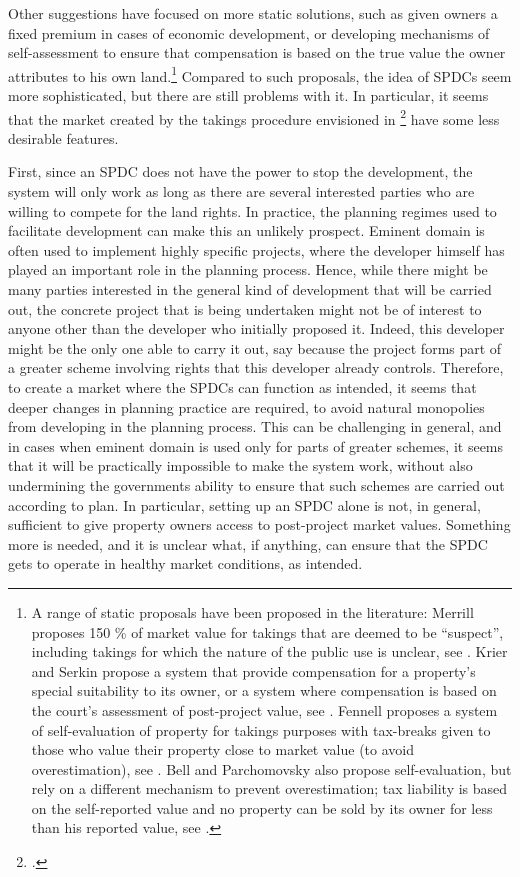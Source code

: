 Other suggestions have focused on more static solutions, such as given owners a fixed premium in cases of economic development, or developing mechanisms of self-assessment to ensure that compensation is based on the true value the owner attributes to his own land.\footnote{A range of static proposals have been proposed in the literature: Merrill proposes 150 \% of market value for takings that are deemed to be ``suspect'', including takings for which the nature of the public use is unclear, see \cite[90-93]{merrill86}. Krier and Serkin propose a system that provide compensation for a property's special suitability to its owner, or a system where compensation is based on the court's assessment of post-project value, see \cite[865-873]{krier04}. Fennell proposes a system of self-evaluation of property for takings purposes with tax-breaks given to those who value their property close to market value (to avoid overestimation), see \cite[995-996]{fennell04}. Bell and Parchomovsky also propose self-evaluation, but rely on a different mechanism to prevent overestimation; tax liability is based on the self-reported value and no property can be sold by its owner for less than his reported value, see \cite[890-900]{bell07}.} Compared to such proposals, the idea of SPDCs seem more sophisticated, but there are still problems with it. In particular, it seems that the market created by the takings procedure envisioned in \footcite{lehavi07} have some less desirable features.

First, since an SPDC does not have the power to stop the development, the system will only work as long as there are several interested parties who are willing to compete for the land rights. In practice, the planning regimes used to facilitate development can make this an unlikely prospect. Eminent domain is often used to implement highly specific projects, where the developer himself has played an important role in the planning process. Hence, while there might be many parties interested in the general kind of development that will be carried out, the concrete project that is being undertaken might not be of interest to anyone other than the developer who initially proposed it. Indeed, this developer might be the only one able to carry it out, say because the project forms part of a greater scheme involving rights that this developer already controls. Therefore, to create a market where the SPDCs can function as intended, it seems that deeper changes in planning practice are required, to avoid natural monopolies from developing in the planning process. This can be challenging in general, and in cases when eminent domain is used only for parts of greater schemes, it seems that it will be practically impossible to make the system work, without also undermining the governments ability to ensure that such schemes are carried out according to plan. In particular, setting up an SPDC alone is not, in general, sufficient to give property owners access to post-project market values. Something more is needed, and it is unclear what, if anything, can ensure that the SPDC gets to operate in healthy market conditions, as intended.

